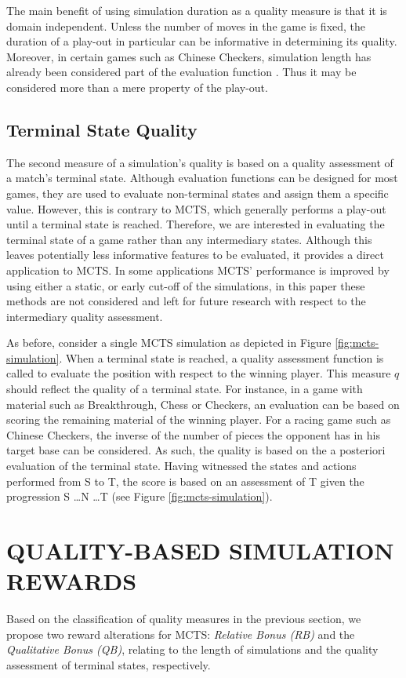 \documentclass{ecai2014}
\newcommand{\node}[1]{{\fontfamily{phv}\selectfont#1}}
\begin{document}
The main benefit of using simulation duration as a quality measure is that it is domain independent. Unless the number of moves in the game is fixed, the duration of a play-out in particular can be informative in determining its quality. Moreover, in certain games such as Chinese Checkers, simulation length has already been considered part of the evaluation function \cite{roschke2013cc}. Thus it may be considered more than a mere property of the play-out.

\subsection{Terminal State Quality}
\label{sub:termqual}
The second measure of a simulation's quality is based on a quality assessment of a match's terminal state. Although evaluation functions can be designed for most games, they are used to evaluate non-terminal states and assign them a specific value. However, this is contrary to MCTS, which generally performs a play-out until a terminal state is reached. Therefore, we are interested in evaluating the terminal state of a game rather than any intermediary states. Although this leaves potentially less informative features to be evaluated, it provides a direct application to MCTS. In some applications MCTS' performance is improved by using either a static, or early cut-off of the simulations, in this paper these methods are not considered and left for future research with respect to the intermediary quality assessment.

As before, consider a single MCTS simulation as depicted in Figure \ref{fig:mcts-simulation}. When a terminal state is reached, a quality assessment function is called to evaluate the position with respect to the winning player. This measure $q$ should reflect the quality of a terminal state. For instance, in a game with material such as Breakthrough, Chess or Checkers, an evaluation can be based on scoring the remaining material of the winning player. For a racing game such as Chinese Checkers, the inverse of the number of pieces the opponent has in his target base can be considered. As such, the quality is based on the a posteriori evaluation of the terminal state. Having witnessed the states and actions performed from \node{S} to \node{T}, the score is based on an assessment of \node{T} given the progression \node{S} \ldots \node{N} \ldots \node{T} (see Figure \ref{fig:mcts-simulation}).

\section{QUALITY-BASED SIMULATION REWARDS}
\label{sec:qoreward}
Based on the classification of quality measures in the previous section, we propose two reward alterations for MCTS: \emph{Relative Bonus (RB)} and the \emph{Qualitative Bonus (QB)}, relating to the length of simulations and the quality assessment of terminal states, respectively. 
\end{document}
